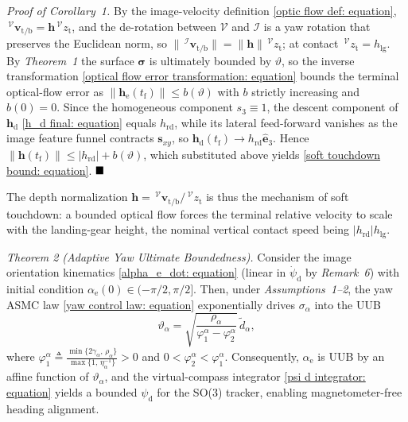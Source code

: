 \documentclass{IEEEtaes}
\begin{document}
\textit{Proof of Corollary~1.} By the image-velocity definition \eqref{optic flow def: equation}, $\,^\mathcal{V}\boldsymbol{v}_{\text{t/b}}=\boldsymbol{h}\,^\mathcal{V}z_\text{t}$, and the de-rotation between $\mathcal{V}$ and $\mathcal{I}$ is a yaw rotation that preserves the Euclidean norm, so $\|\,^\mathcal{I}\boldsymbol{v}_{\text{t/b}}\|=\|\boldsymbol{h}\|\,^\mathcal{V}z_\text{t}$; at contact $\,^\mathcal{V}z_\text{t}=h_\text{lg}$. By \textit{Theorem~1} the surface $\boldsymbol{\sigma}$ is ultimately bounded by $\vartheta$, so the inverse transformation \eqref{optical flow error transformation: equation} bounds the terminal optical-flow error as $\|\boldsymbol{h}_\text{e}(t_\text{f})\|\le b(\vartheta)$ with $b$ strictly increasing and $b(0)=0$. Since the homogeneous component $s_3\equiv 1$, the descent component of $\boldsymbol{h}_\text{d}$ \eqref{h_d final: equation} equals $h_\text{rd}$, while its lateral feed-forward vanishes as the image feature funnel contracts $\boldsymbol{s}_{xy}$, so $\boldsymbol{h}_\text{d}(t_\text{f})\to h_\text{rd}\hat{\boldsymbol{e}}_3$. Hence $\|\boldsymbol{h}(t_\text{f})\|\le|h_\text{rd}|+b(\vartheta)$, which substituted above yields \eqref{soft touchdown bound: equation}. $\hfill\blacksquare$

The depth normalization $\boldsymbol{h}=\,^\mathcal{V}\boldsymbol{v}_{\text{t/b}}/\,^\mathcal{V}z_\text{t}$ is thus the mechanism of soft touchdown: a bounded optical flow forces the terminal relative velocity to scale with the landing-gear height, the nominal vertical contact speed being $|h_\text{rd}|h_\text{lg}$.

\textit{Theorem 2 (Adaptive Yaw Ultimate Boundedness).}
Consider the image orientation kinematics \eqref{alpha_e_dot: equation} (linear in $\dot{\psi}_\text{d}$ by \textit{Remark~6}) with initial condition $\alpha_\text{e}(0)\in(-\pi/2,\pi/2]$. Then, under \textit{Assumptions~1--2}, the yaw ASMC law \eqref{yaw control law: equation} exponentially drives $\sigma_\alpha$ into the UUB
\begin{equation} \label{yaw UUB bound: equation}
    \vartheta_\alpha = \sqrt{\frac{\rho_\alpha}{\varphi_1^\alpha-\varphi_2^\alpha}}\,\tilde{d}_\alpha,
\end{equation}
where $\varphi_1^\alpha \triangleq \frac{\min\{2\gamma_\alpha,\,\rho_\alpha\}}{\max\{1,\,\eta_\alpha^{-1}\}}>0$ and $0<\varphi_2^\alpha<\varphi_1^\alpha$. Consequently, $\alpha_\text{e}$ is UUB by an affine function of $\vartheta_\alpha$, and the virtual-compass integrator \eqref{psi d integrator: equation} yields a bounded $\psi_\text{d}$ for the SO(3) tracker, enabling magnetometer-free heading alignment.
\end{document}
